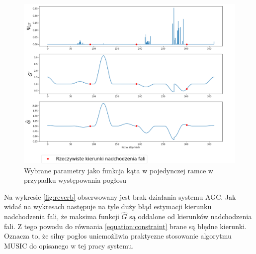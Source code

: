 \begin{figure}[h!]
    \centering
    \includegraphics[width=\textwidth]{Images/reverb_params_in_angle.png}
    \caption{Wybrane parametry jako funkcja kąta w pojedynczej ramce w przypadku występowania pogłosu}
    \label{fig:reverb_params_in_angle}
\end{figure}

\noindent Na wykresie \ref{fig:reverb} obserwowany jest brak działania systemu AGC. Jak widać na wykresach następuje na tyle duży błąd estymacji kierunku nadchodzenia fali, że maksima funkcji $\widehat{G}$ są oddalone od kierunków nadchodzenia fali. Z tego powodu do równania \ref{equation:constraint} brane są błędne kierunki. Oznacza to, że silny pogłos uniemożliwia praktyczne stosowanie algorytmu MUSIC do opisanego w tej pracy systemu.













